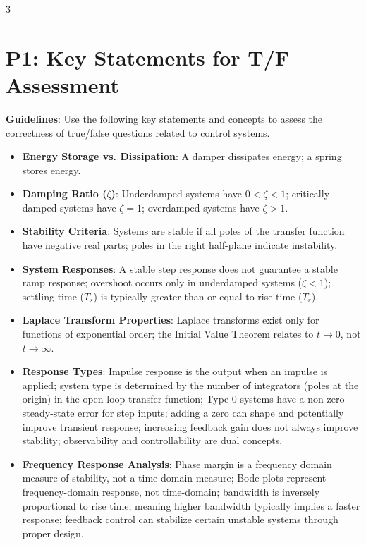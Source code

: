 \documentclass[letterpaper,10pt]{article}
\begin{document}
\small
\begin{multicols}{3}

\section*{P1: Key Statements for T/F Assessment}

\textbf{Guidelines}: Use the following key statements and concepts to assess the correctness of true/false questions related to control systems.

\begin{itemize}[leftmargin=*]
    \item \textbf{Energy Storage vs. Dissipation}: A damper dissipates energy; a spring stores energy.
    
    \item \textbf{Damping Ratio (\(\zeta\))}: Underdamped systems have \(0 < \zeta < 1\); critically damped systems have \(\zeta = 1\); overdamped systems have \(\zeta > 1\).
    
    \item \textbf{Stability Criteria}: Systems are stable if all poles of the transfer function have negative real parts; poles in the right half-plane indicate instability.
    
    \item \textbf{System Responses}: A stable step response does not guarantee a stable ramp response; overshoot occurs only in underdamped systems (\(\zeta < 1\)); settling time (\(T_s\)) is typically greater than or equal to rise time (\(T_r\)).
    
    \item \textbf{Laplace Transform Properties}: Laplace transforms exist only for functions of exponential order; the Initial Value Theorem relates to \(t \to 0\), not \(t \to \infty\).
    
    \item \textbf{Response Types}: Impulse response is the output when an impulse is applied; system type is determined by the number of integrators (poles at the origin) in the open-loop transfer function; Type 0 systems have a non-zero steady-state error for step inputs; adding a zero can shape and potentially improve transient response; increasing feedback gain does not always improve stability; observability and controllability are dual concepts.
    
    \item \textbf{Frequency Response Analysis}: Phase margin is a frequency domain measure of stability, not a time-domain measure; Bode plots represent frequency-domain response, not time-domain; bandwidth is inversely proportional to rise time, meaning higher bandwidth typically implies a faster response; feedback control can stabilize certain unstable systems through proper design.
    

\end{itemize}
\end{multicols}
\end{document}

